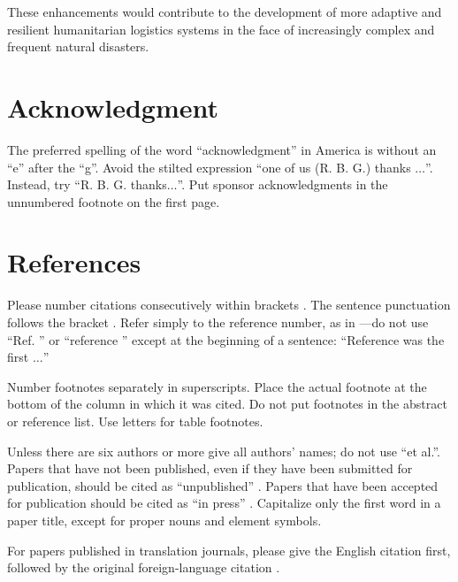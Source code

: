 \documentclass[journal,final,a4paper,twoside,11pt]{IEEEtran}
\begin{document}
These enhancements would contribute to the development of more adaptive and resilient humanitarian logistics systems in the face of increasingly complex and frequent natural disasters.


\section*{Acknowledgment}

The preferred spelling of the word ``acknowledgment'' in America is without 
an ``e'' after the ``g''. Avoid the stilted expression ``one of us (R. B. 
G.) thanks $\ldots$''. Instead, try ``R. B. G. thanks$\ldots$''. Put sponsor 
acknowledgments in the unnumbered footnote on the first page.

\section*{References}

Please number citations consecutively within brackets \cite{b1}. The 
sentence punctuation follows the bracket \cite{b2}. Refer simply to the reference 
number, as in \cite{b3}---do not use ``Ref. \cite{b3}'' or ``reference \cite{b3}'' except at 
the beginning of a sentence: ``Reference \cite{b3} was the first $\ldots$''

Number footnotes separately in superscripts. Place the actual footnote at 
the bottom of the column in which it was cited. Do not put footnotes in the 
abstract or reference list. Use letters for table footnotes.

Unless there are six authors or more give all authors' names; do not use 
``et al.''. Papers that have not been published, even if they have been 
submitted for publication, should be cited as ``unpublished'' \cite{b4}. Papers 
that have been accepted for publication should be cited as ``in press'' \cite{b5}. 
Capitalize only the first word in a paper title, except for proper nouns and 
element symbols.

For papers published in translation journals, please give the English 
citation first, followed by the original foreign-language citation \cite{b6}.


 




\label{lastPage}
\end{document}
